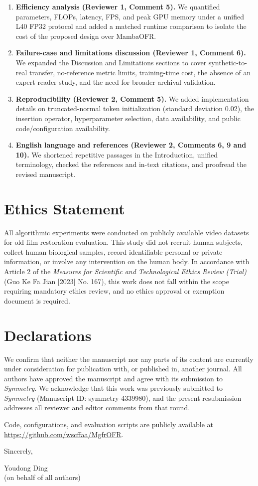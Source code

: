 \documentclass[11pt]{article}
\begin{document}
\begin{enumerate}
\item \textbf{Efficiency analysis (Reviewer 1, Comment 5).} We quantified parameters, FLOPs, latency, FPS, and peak GPU memory under a unified L40 FP32 protocol and added a matched runtime comparison to isolate the cost of the proposed design over MambaOFR.

\item \textbf{Failure-case and limitations discussion (Reviewer 1, Comment 6).} We expanded the Discussion and Limitations sections to cover synthetic-to-real transfer, no-reference metric limits, training-time cost, the absence of an expert reader study, and the need for broader archival validation.

\item \textbf{Reproducibility (Reviewer 2, Comment 5).} We added implementation details on truncated-normal token initialization (standard deviation 0.02), the insertion operator, hyperparameter selection, data availability, and public code/configuration availability.

\item \textbf{English language and references (Reviewer 2, Comments 6, 9 and 10).} We shortened repetitive passages in the Introduction, unified terminology, checked the references and in-text citations, and proofread the revised manuscript.
\end{enumerate}

\section*{Ethics Statement}

All algorithmic experiments were conducted on publicly available video datasets for old film restoration evaluation. This study did not recruit human subjects, collect human biological samples, record identifiable personal or private information, or involve any intervention on the human body. In accordance with Article 2 of the \emph{Measures for Scientific and Technological Ethics Review (Trial)} (Guo Ke Fa Jian [2023] No. 167), this work does not fall within the scope requiring mandatory ethics review, and no ethics approval or exemption document is required.

\section*{Declarations}

We confirm that neither the manuscript nor any parts of its content are currently under consideration for publication with, or published in, another journal. All authors have approved the manuscript and agree with its submission to \emph{Symmetry}. We acknowledge that this work was previously submitted to \emph{Symmetry} (Manuscript ID: symmetry-4339980), and the present resubmission addresses all reviewer and editor comments from that round.

Code, configurations, and evaluation scripts are publicly available at \url{https://github.com/wscffaa/MgfrOFR}.

Sincerely,

Youdong Ding \\
(on behalf of all authors)
\end{document}
